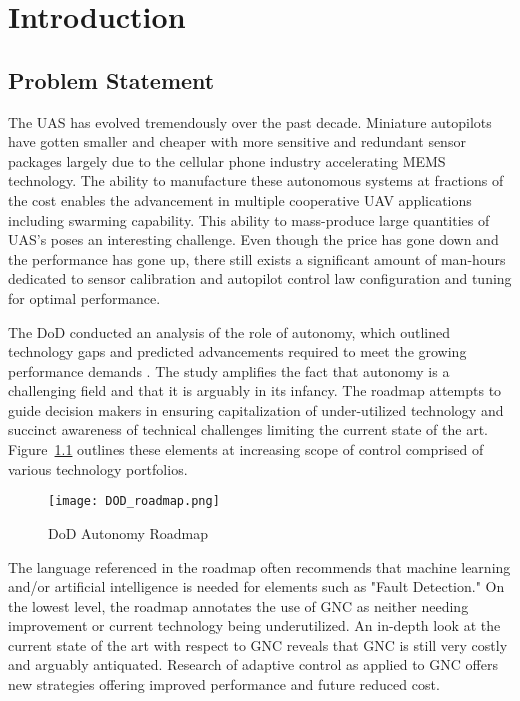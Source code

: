 \chapter{Introduction}\label{ch:intro}

\section{Problem Statement}
The \ac{UAS} has evolved tremendously over the past decade.  Miniature autopilots have gotten smaller and cheaper with more sensitive and redundant sensor packages largely due to the cellular phone industry accelerating \ac{MEMS} technology.  The ability to manufacture these autonomous systems at fractions of the cost enables the advancement in multiple cooperative UAV applications including swarming capability.  This ability to mass-produce large quantities of \ac{UAS}'s poses an interesting challenge.  Even though the price has gone down and the performance has gone up, there still exists a significant amount of man-hours dedicated to sensor calibration and autopilot control law configuration and tuning for optimal performance.  

The \ac{DoD} conducted an analysis of the role of autonomy, which outlined technology gaps and predicted advancements required to meet the growing performance demands \cite{dodroadmap}.  The study amplifies the fact that autonomy is a challenging field and that it is arguably in its infancy.  The roadmap attempts to guide decision makers in ensuring capitalization of under-utilized technology and succinct awareness of technical challenges limiting the current state of the art.  Figure~\ref{fig:dod_roadmap} outlines these elements at increasing scope of control comprised of various technology portfolios.  
\begin{figure}[h!]
 \centering
  \texttt{[image: DOD\_roadmap.png]}
  \caption{DoD Autonomy Roadmap \cite{dodroadmap}}
  \label{fig:dod_roadmap}
\end{figure}
The language referenced in the roadmap often recommends that machine learning and/or artificial intelligence is needed for elements such as "Fault Detection."  On the lowest level, the roadmap annotates the use of \ac{GNC} as neither needing improvement or current technology being underutilized.  An in-depth look at the current state of the art with respect to \ac{GNC} reveals that \ac{GNC} is still very costly and arguably antiquated.  Research of adaptive control as applied to \ac{GNC} offers new strategies offering improved performance and future reduced cost.

